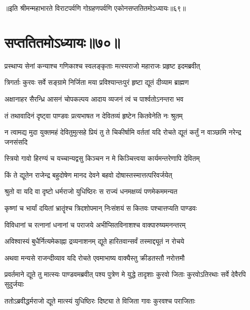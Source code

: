 ॥इति श्रीमन्महाभारते विराटपर्वणि गोग्रहणपर्वणि एकोनसप्ततितमोऽध्यायः॥६९॥

\chapter{सप्ततितमोऽध्यायः॥७०॥}

\twolineshloka
{प्रस्थाप्य सेनां कन्याश्च गणिकाश्च स्वलङ्कृताः}
{मत्स्यराजो महाराजः प्रहृष्ट इदमब्रवीत्}


\twolineshloka
{त्रिगर्ताः कुरवः सर्वे सङ्ग्रामे निर्जिता मया}
{प्रविश्यान्तःपुरं हृष्टा द्यूतं दीव्याम ब्राह्मण}


\twolineshloka
{अक्षानाहर सैरन्ध्रि आसनं चोपकल्पय}
{आदाय व्यजनं त्वं च पार्श्वतोऽनन्तरा भव}


\twolineshloka
{तं तथावादिनं दृष्ट्वा पाण्डवः प्रत्यभाषत}
{न देवितव्यं हृष्टेन कितवेनेति नः श्रुतम्}


\threelineshloka
{न त्वामद्य मुदा युक्तमहं देवितुमुत्सहे}
{प्रियं तु ते चिकीर्षामि वर्ततां यदि रोचते}
{द्यूतं कर्तुं न वाञ्छामि नरेन्द्र जनसंसदि}




\twolineshloka
{स्त्रियो गावो हिरण्यं च यच्चान्यद्वसु किञ्चन}
{न मे किञ्चित्त्वया कार्यमन्तरेणापि देवितम्}




\twolineshloka
{किं ते द्यूतेन राजेन्द्र बहुदोषेण मानद}
{देवने बहवो दोषास्तस्मात्तत्परिवर्जयेत्}


\twolineshloka
{श्रुतो वा यदि वा दृष्टो धर्मराजो युधिष्ठिरः}
{स राज्यं धनमक्षय्यं पणमेकममन्यत}


\twolineshloka
{कृष्णां च भार्यां दयितां भ्रातॄंश्च त्रिदशोपमान्}
{निःसंशयं स कितवः पश्चात्तप्यति पाण्डवः}


\twolineshloka
{विविधानां च रत्नानां धनानां च पराजये}
{अभीप्सितविनाशश्च वाक्पारुष्यमनन्तरम्}


\twolineshloka
{अविश्वास्यं बुधैर्नित्यमेकाह्ना द्रव्यनाशनम्}
{द्यूते हारितवान्सर्वं तस्माद्द्यूतं न रोचये}


\twolineshloka
{अथवा मन्यसे राजन्दीव्याव यदि रोचते}
{एवमाभाष्य वाक्यैस्तु क्रीडतस्तौ नरोत्तमौ}


\onelineshloka
{प्रवर्तमाने द्यूते तु मात्स्यः पाण्डवमब्रवीत्}
\twolineshloka
{पश्य पुत्रेण मे युद्धे तादृशाः कुरवो जिताः}
{कुरवोऽतिरथाः सर्वे देवैरपि सुदुर्जयाः}


\twolineshloka
{ततोऽब्रवीद्धर्मराजो द्यूते मात्स्यं युधिष्ठिरः}
{दिष्ट्या ते विजिता गावः कुरवश्च पराजिताः}



